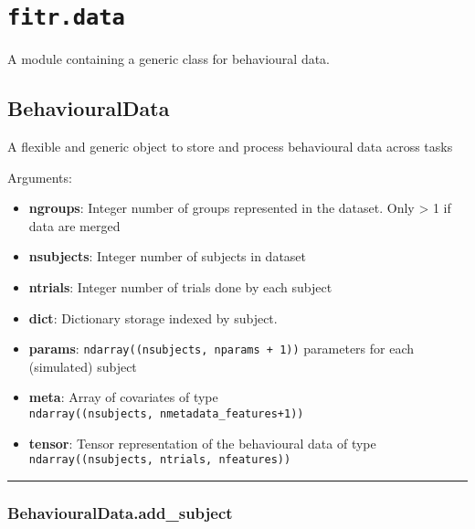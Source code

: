 \hypertarget{fitr.data}{%
\section{\texorpdfstring{\texttt{fitr.data}}{fitr.data}}\label{fitr.data}}

A module containing a generic class for behavioural data.

\hypertarget{behaviouraldata}{%
\subsection{BehaviouralData}\label{behaviouraldata}}

\begin{Shaded}
\begin{Highlighting}[]
\end{Highlighting}
\end{Shaded}

A flexible and generic object to store and process behavioural data
across tasks

Arguments:

\begin{itemize}
\tightlist
\item
  \textbf{ngroups}: Integer number of groups represented in the dataset.
  Only \textgreater{} 1 if data are merged
\item
  \textbf{nsubjects}: Integer number of subjects in dataset
\item
  \textbf{ntrials}: Integer number of trials done by each subject
\item
  \textbf{dict}: Dictionary storage indexed by subject.
\item
  \textbf{params}: \texttt{ndarray((nsubjects,\ nparams\ +\ 1))}
  parameters for each (simulated) subject
\item
  \textbf{meta}: Array of covariates of type
  \texttt{ndarray((nsubjects,\ nmetadata\_features+1))}
\item
  \textbf{tensor}: Tensor representation of the behavioural data of type
  \texttt{ndarray((nsubjects,\ ntrials,\ nfeatures))}
\end{itemize}

\begin{center}\rule{0.5\linewidth}{\linethickness}\end{center}

\hypertarget{behaviouraldata.add_subject}{%
\subsubsection{BehaviouralData.add\_subject}\label{behaviouraldata.add_subject}}


